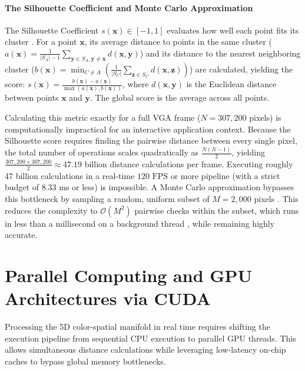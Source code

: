 \paragraph{The Silhouette Coefficient and Monte Carlo Approximation}
The Silhouette Coefficient $s(\mathbf{x}) \in [-1, 1]$ evaluates how well each point fits its cluster \cite{rousseeuw1987silhouettes,shutaywi2021silhouette}. For a point $\mathbf{x}$, its average distance to points in the same cluster ($a(\mathbf{x}) = \frac{1}{|S_A| - 1} \sum_{\mathbf{y} \in S_A, \mathbf{y} \neq \mathbf{x}} d(\mathbf{x}, \mathbf{y})$) and its distance to the nearest neighboring cluster ($b(\mathbf{x}) = \min_{C \neq A} \left( \frac{1}{|S_C|} \sum_{\mathbf{z} \in S_C} d(\mathbf{x}, \mathbf{z}) \right)$) are calculated, yielding the score: $s(\mathbf{x}) = \frac{b(\mathbf{x}) - a(\mathbf{x})}{\max(a(\mathbf{x}), b(\mathbf{x}))}$, where $d(\mathbf{x}, \mathbf{y})$ is the Euclidean distance between points $\mathbf{x}$ and $\mathbf{y}$. The global score is the average across all points.

\label{subsect:silhouette_complexity}
Calculating this metric exactly for a full VGA frame ($N = 307,200$ pixels) is computationally impractical for an interactive application context. Because the Silhouette score requires finding the pairwise distance between every single pixel, the total number of operations scales quadratically as $\frac{N(N-1)}{2}$, yielding $\frac{307,200 \times 307,200}{2} \approx 47.19$ billion distance calculations per frame. Executing roughly 47 billion calculations in a real-time $120\text{ FPS}$ or more pipeline (with a strict budget of $8.33\text{ ms}$ or less) is impossible. A Monte Carlo approximation bypasses this bottleneck by sampling a random, uniform subset of $M=2,000$ pixels \cite{shutaywi2021silhouette}. This reduces the complexity to $\mathcal{O}(M^2)$ pairwise checks within the subset, which runs in less than a millisecond on a background thread \cite{williams2019c++}, while remaining highly accurate.

\section{Parallel Computing and GPU Architectures via CUDA}
Processing the 5D color-spatial manifold in real time requires shifting the execution pipeline from sequential CPU execution to parallel GPU threads. This allows simultaneous distance calculations while leveraging low-latency on-chip caches to bypass global memory bottlenecks.

